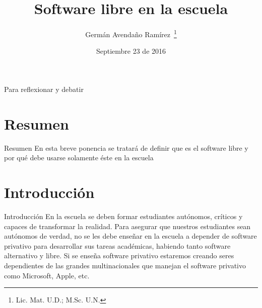\documentclass{beamer}
\title{Software libre en la escuela}
\author{Germán Avendaño Ramírez~\thanks{Lic. Mat. U.D.; M.Sc. U.N.}}
\institute[Universities of Somewhere and Elsewhere] %
{
  \inst{}%
  Docente de Matemáticas\\
  Colegio Arborizadora Baja I.E.D.\\
  \vskip5mm
  Delegado a la Asamblea\\
  ADE
  }
\date{Septiembre 23 de 2016}
\begin{document}
\begin{frame}
  \titlepage
\end{frame}

\begin{frame}{Para reflexionar y debatir}
  \tableofcontents
\end{frame}




\section{Resumen}
\begin{frame}{Resumen}
En esta breve ponencia se tratará de definir que es el software libre y por qué debe usarse solamente éste en la escuela
\end{frame}
\section[Introducción]{Introducción}
\begin{frame}{Introducción}
En la escuela se deben formar estudiantes autónomos, críticos y capaces de transformar la realidad. Para asegurar que nuestros estudiantes sean autónomos de verdad, no se les debe enseñar en la escuela a depender de software privativo para desarrollar sus tareas académicas, habiendo tanto software alternativo y libre. Si se enseña software privativo estaremos creando seres dependientes de las grandes multinacionales que manejan el software privativo como Microsoft, Apple, etc.
\end{frame} 
\end{document}
